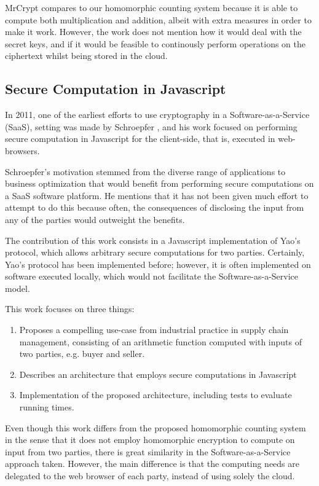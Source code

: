 MrCrypt compares to our homomorphic counting system because it is able to compute both multiplication and addition, albeit with extra measures in order to make it work. However, the work does not mention how it would deal with the secret keys, and if it would be feasible to continously perform operations on the ciphertext whilst being stored in the cloud.

\subsection{Secure Computation in Javascript}

In 2011, one of the earliest efforts to use cryptography in a Software-as-a-Service (SaaS), setting was made by Schroepfer \cite{Schroepfer:2011:DSC:2046707.2093509}, and his work focused on performing secure computation in Javascript for the client-side, that is, executed in web-browsers.

Schroepfer's motivation stemmed from the diverse range of applications to business optimization that would benefit from performing secure computations on a SaaS software platform. He mentions that it has not been given much effort to attempt to do this because often, the consequences of disclosing the input from any of the parties would outweight the benefits.

The contribution of this work consists in a Javascript implementation of Yao's \cite{Yao:1986:GES:1382439.1382944} protocol, which allows arbitrary secure computations for two parties. Certainly, Yao's protocol has been implemented before; however, it is often implemented on software executed locally, which would not facilitate the Software-as-a-Service model.

This work focuses on three things:
\begin{enumerate}
\item Proposes a compelling use-case from industrial practice in supply chain management, consisting of an arithmetic function computed with inputs of two parties, e.g. buyer and seller.
\item Describes an architecture that employs secure computations in Javascript
  \item Implementation of the proposed architecture, including tests to evaluate running times.
\end{enumerate}
   
Even though this work differs from the proposed homomorphic counting system in the sense that it does not employ homomorphic encryption to compute on input from two parties, there is great similarity in the Software-as-a-Service approach taken. However, the main difference is that the computing needs are delegated to the web browser of each party, instead of using solely the cloud.

